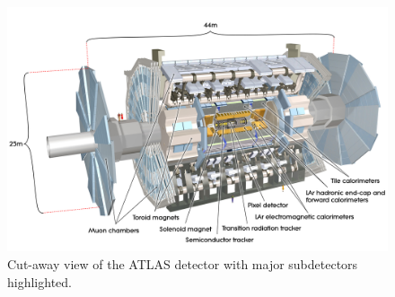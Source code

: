 	\begin{figure}[!ht]
	\centering
	\includegraphics[width=.75\textwidth,keepaspectratio=true]{chapters/chapter3_experiment/images/ATLAS_3d_run2.jpg}
	\caption{ Cut-away view of the \gls{ATLAS} detector with major subdetectors highlighted. \cite{atlas-schematics}}
	\label{fig:ATLAS}
	\end{figure}



